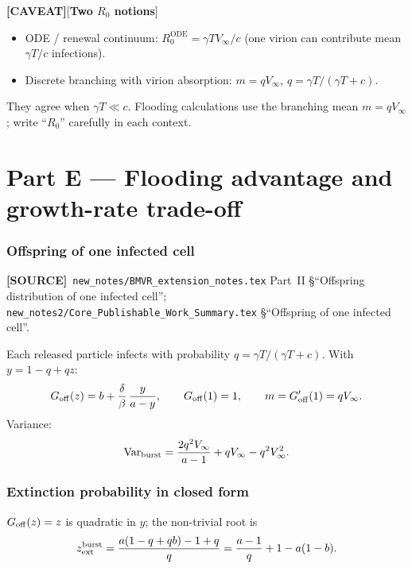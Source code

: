 \documentclass[11pt,a4paper]{article}
\theoremstyle{plain}
\theoremstyle{definition}
\theoremstyle{remark}
\newcommand{\CAVEAT}{\textcolor{orange!70!black}{\textbf{[CAVEAT]}}}
\newcommand{\SOURCE}{\textcolor{gray!50!black}{\textbf{[SOURCE]}}}
\begin{document}
\CAVEAT[\textbf{Two $R_0$ notions}]
\begin{itemize}
\item ODE / renewal continuum: $R_0^{\mathrm{ODE}}=\gamma T V_\infty/c$
  (one virion can contribute mean $\gamma T/c$ infections).
\item Discrete branching with virion absorption:
  $m=q V_\infty$, $q=\gamma T/(\gamma T+c)$.
\end{itemize}
They agree when $\gamma T\ll c$. Flooding calculations use the branching mean
$m=q V_\infty$; write ``$R_0$'' carefully in each context.

\part*{Part E --- Flooding advantage and growth-rate trade-off}

\section{Offspring of one infected cell}
\label{sec:offspring}
\SOURCE\
\texttt{new\_notes/BMVR\_extension\_notes.tex}
Part~II \S``Offspring distribution of one infected cell'';
\texttt{new\_notes2/Core\_Publishable\_Work\_Summary.tex}
\S``Offspring of one infected cell''.

Each released particle infects with probability $q=\gamma T/(\gamma T+c)$.
With $y=1-q+qz$:
\begin{equation}
G_{\rm off}(z)=b+\frac{\delta}{\beta}\,\frac{y}{a-y},
\qquad
G_{\rm off}(1)=1,
\qquad
m=G_{\rm off}'(1)=q V_\infty.
\end{equation}
Variance:
\[
\mathrm{Var}_{\rm burst}
=\frac{2q^2 V_\infty}{a-1}+q V_\infty-q^2 V_\infty^2.
\]

\section{Extinction probability in closed form}

$G_{\rm off}(z)=z$ is quadratic in $y$; the non-trivial root is
\begin{equation}
z_{\rm ext}^{\rm burst}
=\frac{a(1-q+qb)-1+q}{q}
=\frac{a-1}{q}+1-a(1-b).
\end{equation}
\end{document}
